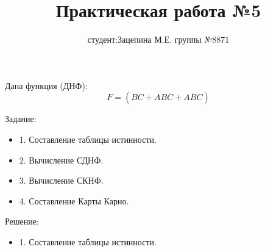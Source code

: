 \documentclass{article}
\title{Практическая работа №5}
\author{студент:Зацепина М.Е.    группы №8871   }
\begin{document}
\maketitle
Дана функция (ДНФ):
$$
F=(BC+AB\overline{C} + A\overline{B}C)
$$

Задание: 
\begin{itemize}
\item 1. Составление таблицы истинности.
\item 2. Вычисление СДНФ.
\item 3. Вычисление СКНФ.
\item 4. Составление Карты Карно.
\end{itemize}
Решение: 
\begin{itemize}
	\item 1. Составление таблицы истинности.
	

\end{itemize}
\end{document}
